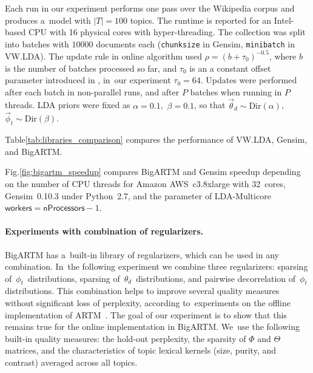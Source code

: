 \documentclass[russian]{llncs}
\newcommand{\kw}[1]{\textsf{#1}}
\begin{document}
Each run in our experiment performs one pass over the Wikipedia corpus and produces a~model with $|T|=100$ topics.
The runtime is reported for an Intel-based CPU with 16 physical cores with hyper-threading.
The collection was split into batches with $10 000$ documents each
(\texttt{chunksize} in Gensim, \texttt{minibatch} in VW.LDA).
The update rule in online algorithm used
${\rho = (b + \tau_0)^{-0.5}}$,
where $b$ is the number of batches processed so far,
and $\tau_0$ is an a constant offset parameter introduced in \cite{hoffman10online},
in~our experiment ${\tau_0 = 64}$.
Updates were performed after each batch in non-parallel runs, and after $P$ batches when running in $P$ threads.
LDA priors were fixed as
${\alpha = 0.1}$,\, ${\beta = 0.1}$,
so that
$\vec{\theta}_d \sim \text{Dir}(\alpha)$,\,
$\vec{\phi}_t \sim \text{Dir}(\beta)$.

Table\;\ref{tab:libraries_comparison} compares the performance of VW.LDA, Gensim, and BigARTM.

Fig.\;\ref{fig:bigartm_speedup} compares BigARTM and Gensim speedup depending on the number of CPU threads
for Amazon AWS~c3.8xlarge with 32~cores,
Gensim~\mbox{0.10.3} under Python~\mbox{2.7},
and the parameter of LDA-Multicore $\kw{workers}=\kw{nProcessors}-1$.


\paragraph{Experiments with combination of regularizers.}

BigARTM has a~built-in library of regularizers, which can be used in any combination.
In~the following experiment we combine three regularizers:
sparsing of~$\phi_{t}$~distributions,
sparsing of~$\theta_{d}$~distributions, and
pairwise decorrelation of~$\phi_{t}$ distributions.
This combination helps to improve several quality measures without significant loss of perplexity,
according to~experiments on the offline implementation of ARTM~\cite{voron14aist}.
The goal of our experiment is to show that this remains true
for the online implementation in BigARTM.
We~use the following built-in quality measures:
the hold-out perplexity,
the sparsity of $\Phi$ and $\Theta$ matrices, and
the characteristics of topic lexical kernels (size, purity, and contrast) averaged across all topics.
\end{document}
